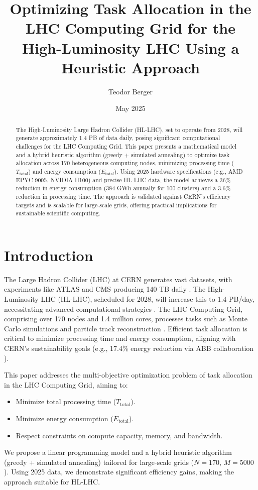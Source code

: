\documentclass[a4paper,11pt]{article}
\title{Optimizing Task Allocation in the LHC Computing Grid for the High-Luminosity LHC Using a Heuristic Approach}
\author{Teodor Berger}
\date{May 2025}
\begin{document}
\maketitle

\begin{abstract}
The High-Luminosity Large Hadron Collider (HL-LHC), set to operate from 2028, will generate approximately 1.4 PB of data daily, posing significant computational challenges for the LHC Computing Grid. This paper presents a mathematical model and a hybrid heuristic algorithm (greedy + simulated annealing) to optimize task allocation across 170 heterogeneous computing nodes, minimizing processing time ($T_{\text{total}}$) and energy consumption ($E_{\text{total}}$). Using 2025 hardware specifications (e.g., AMD EPYC 9005, NVIDIA H100) and precise HL-LHC data, the model achieves a 36\% reduction in energy consumption (384 GWh annually for 100 clusters) and a 3.6\% reduction in processing time. The approach is validated against CERN’s efficiency targets and is scalable for large-scale grids, offering practical implications for sustainable scientific computing.
\end{abstract}

\section{Introduction}
The Large Hadron Collider (LHC) at CERN generates vast datasets, with experiments like ATLAS and CMS producing 140 TB daily \cite{CERN2025}. The High-Luminosity LHC (HL-LHC), scheduled for 2028, will increase this to 1.4 PB/day, necessitating advanced computational strategies \cite{HL-LHC2025}. The LHC Computing Grid, comprising over 170 nodes and 1.4 million cores, processes tasks such as Monte Carlo simulations and particle track reconstruction \cite{LHCGrid2025}. Efficient task allocation is critical to minimize processing time and energy consumption, aligning with CERN’s sustainability goals (e.g., 17.4\% energy reduction via ABB collaboration \cite{CERNABB2025}).

This paper addresses the multi-objective optimization problem of task allocation in the LHC Computing Grid, aiming to:
\begin{itemize}
    \item Minimize total processing time ($T_{\text{total}}$).
    \item Minimize energy consumption ($E_{\text{total}}$).
    \item Respect constraints on compute capacity, memory, and bandwidth.
\end{itemize}
We propose a linear programming model and a hybrid heuristic algorithm (greedy + simulated annealing) tailored for large-scale grids ($N=170$, $M=5000$). Using 2025 data, we demonstrate significant efficiency gains, making the approach suitable for HL-LHC.
\end{document}
